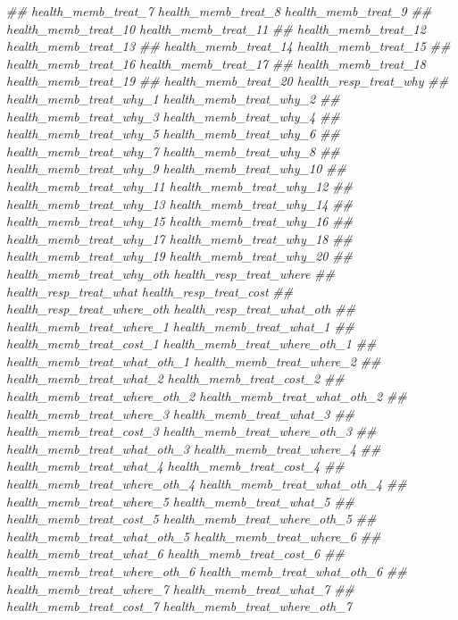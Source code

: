 \documentclass[
]{article}
\newenvironment{Shaded}{\begin{snugshade}}{\end{snugshade}}
\newcommand{\CommentTok}[1]{\textcolor[rgb]{0.56,0.35,0.01}{\textit{#1}}}
\begin{document}
\begin{Shaded}
\begin{Highlighting}[]
\CommentTok{##      health_memb_treat_7 health_memb_treat_8 health_memb_treat_9}
\CommentTok{##      health_memb_treat_10 health_memb_treat_11}
\CommentTok{##      health_memb_treat_12 health_memb_treat_13}
\CommentTok{##      health_memb_treat_14 health_memb_treat_15}
\CommentTok{##      health_memb_treat_16 health_memb_treat_17}
\CommentTok{##      health_memb_treat_18 health_memb_treat_19}
\CommentTok{##      health_memb_treat_20 health_resp_treat_why}
\CommentTok{##      health_memb_treat_why_1 health_memb_treat_why_2}
\CommentTok{##      health_memb_treat_why_3 health_memb_treat_why_4}
\CommentTok{##      health_memb_treat_why_5 health_memb_treat_why_6}
\CommentTok{##      health_memb_treat_why_7 health_memb_treat_why_8}
\CommentTok{##      health_memb_treat_why_9 health_memb_treat_why_10}
\CommentTok{##      health_memb_treat_why_11 health_memb_treat_why_12}
\CommentTok{##      health_memb_treat_why_13 health_memb_treat_why_14}
\CommentTok{##      health_memb_treat_why_15 health_memb_treat_why_16}
\CommentTok{##      health_memb_treat_why_17 health_memb_treat_why_18}
\CommentTok{##      health_memb_treat_why_19 health_memb_treat_why_20}
\CommentTok{##      health_memb_treat_why_oth health_resp_treat_where}
\CommentTok{##      health_resp_treat_what health_resp_treat_cost}
\CommentTok{##      health_resp_treat_where_oth health_resp_treat_what_oth}
\CommentTok{##      health_memb_treat_where_1 health_memb_treat_what_1}
\CommentTok{##      health_memb_treat_cost_1 health_memb_treat_where_oth_1}
\CommentTok{##      health_memb_treat_what_oth_1 health_memb_treat_where_2}
\CommentTok{##      health_memb_treat_what_2 health_memb_treat_cost_2}
\CommentTok{##      health_memb_treat_where_oth_2 health_memb_treat_what_oth_2}
\CommentTok{##      health_memb_treat_where_3 health_memb_treat_what_3}
\CommentTok{##      health_memb_treat_cost_3 health_memb_treat_where_oth_3}
\CommentTok{##      health_memb_treat_what_oth_3 health_memb_treat_where_4}
\CommentTok{##      health_memb_treat_what_4 health_memb_treat_cost_4}
\CommentTok{##      health_memb_treat_where_oth_4 health_memb_treat_what_oth_4}
\CommentTok{##      health_memb_treat_where_5 health_memb_treat_what_5}
\CommentTok{##      health_memb_treat_cost_5 health_memb_treat_where_oth_5}
\CommentTok{##      health_memb_treat_what_oth_5 health_memb_treat_where_6}
\CommentTok{##      health_memb_treat_what_6 health_memb_treat_cost_6}
\CommentTok{##      health_memb_treat_where_oth_6 health_memb_treat_what_oth_6}
\CommentTok{##      health_memb_treat_where_7 health_memb_treat_what_7}
\CommentTok{##      health_memb_treat_cost_7 health_memb_treat_where_oth_7}

\end{Highlighting}
\end{Shaded}
\end{document}
